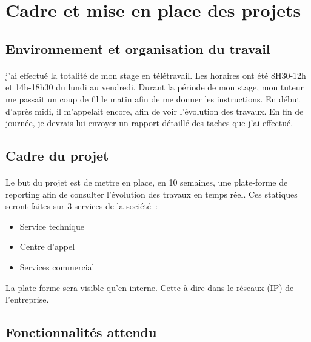 \documentclass[a4paper,12pt]{report}
\begin{document}
\section{Cadre et mise en place des projets}
\subsection{Environnement et organisation du travail}

\paragraph*{}
            j’ai effectué la totalité de mon stage en télétravail. Les horaires ont été 8H30-12h et 14h-18h30 du lundi au vendredi.
           Durant la période de mon stage, mon tuteur me passait un coup de fil le matin afin
           de me donner les instructions. En début d’après midi, il m’appelait encore, afin de voir
           l’évolution des travaux.
           En fin de journée, je devrais lui envoyer un rapport détaillé des taches que j’ai effectué.
\subsection{Cadre du projet}

\paragraph*{}
  Le but du projet est de mettre en place, en 10 semaines, une plate-forme de reporting afin de consulter l'évolution des travaux en temps réel.\newline 
  Ces statiques seront faites sur 3 services de la société :  \newline
 
\begin{itemize}
\item Service technique 
\item Centre d’appel
\item Services commercial \newline
\end{itemize}
La plate forme sera visible qu’en interne. Cette à dire dans le réseaux (IP) de l’entreprise.
\subsection{Fonctionnalités attendu}
\end{document}
